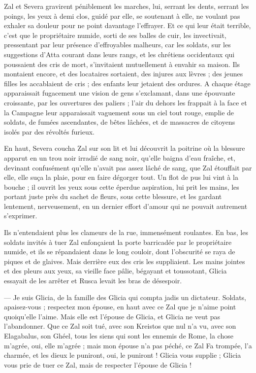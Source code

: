 \documentclass[a4paper, 11pt, oneside, polutonikogreek, french]{article}
\begin{document}
Zal et Severa gravirent péniblement les marches, lui, serrant les dents, serrant les poings, les yeux à demi clos, guidé par elle, se soutenant à elle, ne voulant pas exhaler sa douleur pour ne point davantage l'effrayer. Et ce qui leur était terrible, c'est que le propriétaire numide, sorti de ses balles de cuir, les invectivait, pressentant par leur présence d'effroyables malheurs, car les soldats, sur les suggestions d'Atta courant dans leurs rangs, et les chrétiens occidentaux qui poussaient des cris de mort, s'invitaient mutuellement à envahir sa maison. Ils montaient encore, et des locataires sortaient, des injures aux lèvres ; des jeunes filles les accablaient de cris ; des enfants leur jetaient des ordures. A chaque étage apparaissait fugacement une vision de gens s'exclamant, dans une épouvante croissante, par les ouvertures des paliers ; l'air du dehors les frappait à la face et la Campagne leur apparaissait vaguement sous un ciel tout rouge, emplie de soldats, de fumées ascendantes, de bêtes lâchées, et de massacres de citoyens isolés par des révoltés furieux.

En haut, Severa coucha Zal sur son lit et lui découvrit la poitrine où la blessure apparut en un trou noir irradié de sang noir, qu'elle baigna d'eau fraîche, et, devinant confusément qu'elle n'avait pas assez lâché de sang, que Zal étouffait par elle, elle suça la plaie, pour en faire dégorger tout. Un flot de pus lui vint à la bouche ; il ouvrit les yeux sous cette éperdue aspiration, lui prit les mains, les portant juste près du sachet de fleurs, sous cette blessure, et les gardant lentement, nerveusement, en un dernier effort d'amour qui ne pouvait autrement s'exprimer.

Ils n'entendaient plus les clameurs de la rue, immensément roulantes. En bas, les soldats invités à tuer Zal enfonçaient la porte barricadée par le propriétaire numide, et ils se répandaient dans le long couloir, dont l'obscurité se raya de piques et de glaives. Mais derrière eux des cris les suppliaient. Les mains jointes et des pleurs aux yeux, sa vieille face pâlie, bégayant et toussotant, Glicia essayait de les arrêter et Rusca levait les bras de désespoir.

--- Je suis Glicia, de la famille des Glicia qui compta jadis un dictateur. Soldats, apaisez-vous ; respectez mon épouse, en haut avec ce Zal que je n'aime point quoiqu'elle l'aime. Mais elle est l'épouse de Glicia, et Glicia ne veut pas l'abandonner. Que ce Zal soit tué, avec son Kreistos que nul n'a vu, avec son Elagabalus, son Ghéel, tous les siens qui sont les ennemis de Rome, la chose m'agrée, oui, elle m'agrée ; mais mon épouse n'a pas péché, ce Zal Fa trompée, l'a charmée, et les dieux le puniront, oui, le puniront ! Glicia vous supplie ; Glicia vous prie de tuer ce Zal, mais de respecter l'épouse de Glicia !
\end{document}

